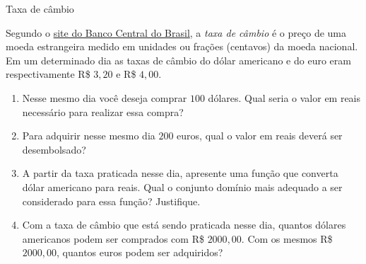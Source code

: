 \label{\detokenize{AF107-1:praticando}}

\begin{task}{Taxa de câmbio}
\label{ativ-cambio}



Segundo o \href{http://www.bcb.gov.br/pre/bc\_atende/port/taxCam.asp}{site do Banco Central do Brasil}, a \emph{taxa de câmbio} é o preço de uma moeda estrangeira medido em unidades ou frações (centavos) da moeda nacional. Em um determinado dia as taxas de câmbio do dólar americano e do euro eram respectivamente R\$ $3{,}20$ e R\$ $4{,}00$.
\begin{enumerate}
\item {} 
Nesse mesmo dia você deseja comprar \(100\) dólares. Qual seria o valor em reais necessário para realizar essa compra?

\item {} 
Para adquirir nesse mesmo dia \(200\) euros, qual o valor em reais deverá ser desembolsado?

\item {} 
A partir da taxa praticada nesse dia, apresente uma função que converta dólar americano para reais. Qual o conjunto domínio mais adequado a ser considerado para essa função? Justifique.

\item {} 
Com a taxa de câmbio que está sendo praticada nesse dia, quantos dólares americanos podem ser comprados com R\$ $2000{,}00$. Com os mesmos R\$ $2000{,}00$, quantos euros podem ser adquiridos?

\end{enumerate}
\end{task}



